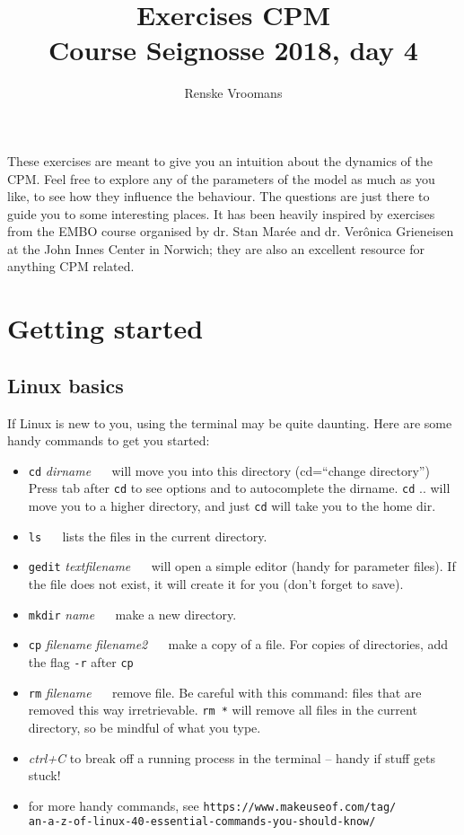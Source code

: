 \documentclass[a4paper,10pt]{article}
\title{Exercises CPM\\ \large Course Seignosse 2018, day 4}
\author{Renske Vroomans}
\date{}
\begin{document}
\maketitle
These exercises are meant to give you an intuition about the dynamics of the CPM. Feel free to explore any of the parameters of the model as much as you like, to see how they influence the behaviour.
The questions are just there to guide you to some interesting places. It has been heavily inspired by exercises from the EMBO course organised by dr. 
Stan Mar\'ee and dr. Ver\^onica Grieneisen at the John Innes Center in Norwich; they are also an excellent resource for anything CPM related.

\section*{Getting started}
\subsection*{Linux basics}
If Linux is new to you, using the terminal may be quite daunting. Here are some handy commands to get you started:
\begin{itemize}
 \item \texttt{cd} \textit{dirname} ~~ will move you into this directory (cd=``change directory'') Press tab after \texttt{cd} to see options and to autocomplete the dirname. \texttt{cd} .. will move you to a higher directory, and just \texttt{cd} will take you to the home dir.
 \item \texttt{ls}  ~~ lists the files in the current directory.
 \item \texttt{gedit} \textit{textfilename}  ~~ will open a simple editor (handy for parameter files). If the file does not exist, it will create it for you (don't forget to save).
  \item \texttt{mkdir} \textit{name}  ~~ make a new directory.
  \item \texttt{cp} \textit{filename} \textit{filename2} ~~ make a copy of a file. For copies of directories, add the flag \texttt{-r} 
after \texttt{cp}
  \item \texttt{rm} \textit{filename} ~~ remove file. Be careful with this command: files that are removed this way irretrievable.  \texttt{rm *} will 
remove all files in the current directory, so be mindful of what you type.
\item \textit{ctrl+C} to break off a running process in the terminal -- handy if stuff gets stuck!
  \item for more handy commands, see \texttt{https://www.makeuseof.com/tag/\\an-a-z-of-linux-40-essential-commands-you-should-know/}
 \end{itemize}
\end{document}
